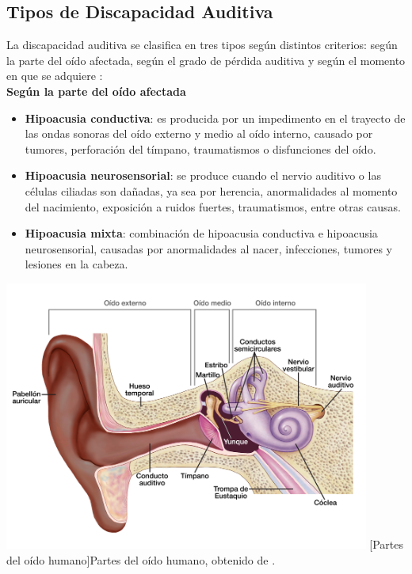 \newpage
\subsection{Tipos de Discapacidad Auditiva}
La discapacidad auditiva se clasifica en tres tipos según distintos criterios: según la parte del oído afectada, según el grado de pérdida auditiva y según el momento en que se adquiere \cite{ref30}:\\
\newline\textbf{Según la parte del oído afectada}
\begin{itemize}
    \item \textbf{Hipoacusia conductiva}: es producida por un impedimento en el trayecto de las ondas sonoras del oído externo y medio al oído interno, causado por tumores, perforación del tímpano, traumatismos o disfunciones del oído.  
    \item \textbf{Hipoacusia neurosensorial}: se produce cuando el nervio auditivo o las células ciliadas son dañadas, ya sea por herencia, anormalidades al momento del nacimiento, exposición a ruidos fuertes, traumatismos, entre otras causas.  
    \item \textbf{Hipoacusia mixta}: combinación de hipoacusia conductiva e hipoacusia neurosensorial, causadas por anormalidades al nacer, infecciones, tumores y lesiones en la cabeza.  
\end{itemize}

\begin{center}
    \includegraphics[width=0.9\textwidth]{Images/Cap 2/PartesOido.jpg}
    [Partes del oído humano]{Partes del oído humano, obtenido de \cite{ref31}.} 
\end{center}

